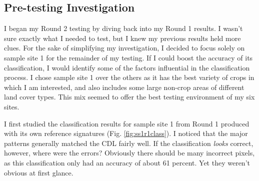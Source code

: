 \subsection*{Pre-testing Investigation}

I began my Round 2 testing by diving back into my Round 1 results. I wasn’t sure exactly what I needed to test, but I knew my previous results held more clues. For the sake of simplifying my investigation, I decided to focus solely on sample site 1 for the remainder of my testing. If I could boost the accuracy of its classification, I would identify some of the factors influential in the classification process. I chose sample site 1 over the others as it has the best variety of crops in which I am interested, and also includes some large non-crop areas of different land cover types. This mix seemed to offer the best testing environment of my six sites.

I first studied the classification results for sample site 1 from Round 1 produced with its own reference signatures (Fig. \ref{fig:ss1r1class}). I noticed that the major patterns generally matched the CDL fairly well. If the classification \textit{looks} correct, however, where were the errors? Obviously there should be many incorrect pixels, as this classification only had an accuracy of about 61 percent. Yet they weren’t obvious at first glance.

